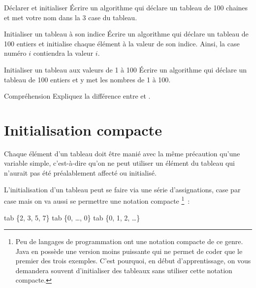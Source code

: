 		\begin{Exercice}{Déclarer et initialiser}
			Écrire un algorithme qui déclare un tableau de 100 chaines
			et met votre nom dans la 3\ieme{} case du tableau.
		\end{Exercice}
	
		\begin{Exercice}{Initialiser un tableau à son indice}
			Écrire un algorithme qui déclare un tableau de 100 entiers
			et initialise chaque élément à la valeur de son indice.
			Ainsi, la case numéro $i$ contiendra la valeur $i$.
		\end{Exercice}

		\begin{Exercice}{Initialiser un tableau aux valeurs de 1 à 100}
			Écrire un algorithme qui déclare un tableau de 100 entiers
			et y met les nombres de 1 à 100.
		\end{Exercice}

		\begin{Exercice}{Compréhension}
			Expliquez la différence entre 
			et .
		\end{Exercice}
		
	\section{Initialisation compacte}

		Chaque élément d’un tableau
		doit être manié avec la même précaution 
		qu’une variable simple, 
		c’est-à-dire qu’on ne peut utiliser un élément du tableau 
		qui n’aurait pas été préalablement affecté ou initialisé.

		L’initialisation d’un tableau peut se faire 
		via une série d’assignations, case par case
		mais on va aussi se permettre une notation compacte%
		\footnote{%
			Peu de langages de programmation 
			ont une notation compacte de ce genre. 
			Java en possède une version moins puissante
			qui ne permet de coder que le premier des trois exemples.
			C’est pourquoi, en début d’apprentissage, 
			on vous demandera souvent d’initialiser des tableaux
			sans utiliser cette notation compacte.
		}~:
		
		\begin{LDA}
			\Let tab \Gets \{2, 3, 5, 7\} 
			\Let tab \Gets \{0, \dots, 0\} 
			\Let tab \Gets \{0, 1, 2, \dots\} 
		\end{LDA}

